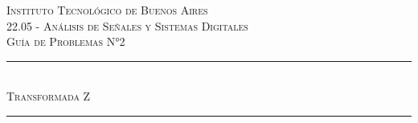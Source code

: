 \begin{titlepage}
    
    \newcommand{\HRule}{\rule{\linewidth}{0.5mm}} %
        
    \center %
         
        
    \textsc{\LARGE Instituto Tecnológico de Buenos Aires}\\[2cm] %
    \textsc{\Large 22.05 - Análisis de Señales y Sistemas Digitales}\\[1.5cm] %
    \textsc{\large Gu\'ia de Problemas N°2}\\[0.5cm] %
        
        
        
    \HRule \\[0.5cm]
    \textsc{ \huge  Transformada Z}\\[0.4cm] %
    \HRule \\[2cm]
         
        

\end{titlepage}
